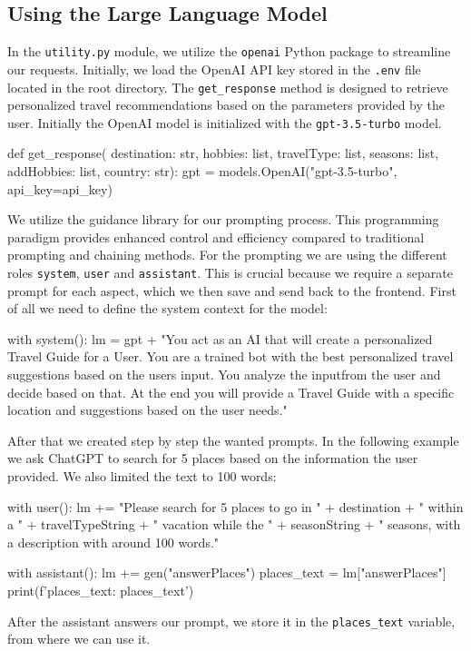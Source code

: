 \documentclass[english,notitlepage,smartquotes]{hgbreport}
\begin{document}
\subsection{Using the Large Language Model}
In the \texttt{utility.py} module, we utilize the \texttt{openai} Python package to streamline our requests. Initially, we load the OpenAI API key stored in the \texttt{.env} file located in the root directory. The \texttt{get\_response} method is designed to retrieve personalized travel recommendations based on the parameters provided by the user. Initially the OpenAI model is initialized with the \texttt{gpt-3.5-turbo} model.
\begin{PythonCode}
	def get_response(
	destination: str, hobbies: list, travelType: list, seasons: list, addHobbies: list, country: str):
	gpt = models.OpenAI("gpt-3.5-turbo", api_key=api_key)
\end{PythonCode}
We utilize the guidance library\cite{GuidenceAI} for our prompting process. This programming paradigm provides enhanced control and efficiency compared to traditional prompting and chaining methods. For the prompting we are using the different roles \texttt{system}, \texttt{user} and \texttt{assistant}. This is crucial because we require a separate prompt for each aspect, which we then save and send back to the frontend. First of all we need to define the system context for the model: 
\begin{PythonCode}
	with system():
	lm = gpt + "You act as an AI that will create a personalized Travel Guide for a User. You are a trained bot with the best personalized travel suggestions based on the users input. You analyze the inputfrom the user and decide based on that. At the end you will provide a Travel Guide with a specific location and suggestions based on the user needs."
\end{PythonCode}
After that we created step by step the wanted prompts. In the following example we ask ChatGPT to search for 5 places based on the information the user provided. We also limited the text to 100 words:
\begin{PythonCode}
	with user():
	lm += "Please search for 5 places to go in " + destination + " within a " + travelTypeString + " vacation while the " + seasonString + " seasons, with a description with around 100 words."
	
	with assistant():
	lm += gen("answerPlaces")
	places_text = lm["answerPlaces"]
	print(f'places_text: {places_text}')
\end{PythonCode}
After the assistant answers our prompt, we store it in the \texttt{places\_text} variable, from where we can use it.
\end{document}
